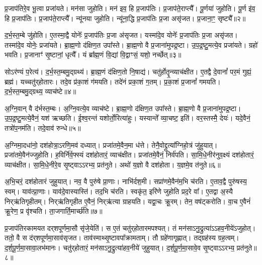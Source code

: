 प्र॒जा\-प॑तिरे॒व भू॒त्वा प्रजा॑यते।
मन॑सा जुहोति।
मन॑ इव॒ हि प्र॒जा\-प॑तिः।
प्र॒जा\-प॑ते॒राप्त्यै᳚।
पू॒र्णया॑ जुहोति।
पू॒र्ण इ॑व॒ हि प्र॒जा\-प॑तिः।
प्र॒जा\-प॑ते॒राप्त्यै᳚।
न्यू॑नया जुहोति।
न्यू॑ना॒द्धि प्र॒जा\-प॑तिः प्र॒जा असृ॑जत।
प्र॒जाना॒ꣳ॒ सृष्ट्यै᳚॥२॥\ip

द॒र्भ॒स्त॒म्बे जु॑होति।
ए॒तस्मा॒द्वै योनेः᳚ प्र॒जा\-प॑तिः प्र॒जा अ॑\-सृजत।
यस्मा॑दे॒व योनेः᳚ प्र॒जा\-प॑तिः प्र॒जा असृ॑जत।
तस्मा॑दे॒व योनेः॒ प्रजा॑यते।
ब्रा॒ह्म॒णो द॑क्षिण॒त उपा᳚स्ते।
ब्रा॒ह्म॒णो वै प्र॒जाना॑मुपद्र॒ष्टा।
उ॒प॒द्र॒ष्टु॒मत्ये॒व प्रजा॑यते।
ग्रहो॑ भवति।
प्र॒जानाꣳ॑ सृ॒ष्टानां॒ धृत्यै᳚।
यं ब्रा᳚ह्म॒णं वि॒द्यां वि॒द्वाꣳसं॒ यशो॒ नर्च्छेत्॥३॥\ip

सोऽर॑ण्यं प॒रेत्य॑।
द॒र्भ॒स्त॒म्बमु॒द्ग्रथ्य॑।
ब्रा॒ह्म॒णं द॑क्षिण॒तो नि॒षाद्य॑।
चतु॑र्\mbox{}होतॄ॒न्व्याच॑क्षीत।
ए॒तद्वै दे॒वानां᳚ पर॒मं गुह्यं॒ ब्रह्म॑।
यच्चतु॑र्‌\mbox{}होतारः।
तदे॒व प्र॑का॒शं ग॑मयति।
तदे॑नं प्रका॒शं ग॒तम्।
प्र॒का॒शं प्र॒जानां᳚ गमयति।
द॒र्भ॒स्त॒म्बमु॒द्ग्रथ्य॒ व्याच॑ष्टे॥४॥\ip

अ॒ग्नि॒वान् वै द॑र्भस्त॒म्बः।
अ॒ग्नि॒वत्ये॒व व्याच॑ष्टे।
ब्रा॒ह्म॒णो द॑क्षिण॒त उपा᳚स्ते।
ब्रा॒ह्म॒णो वै प्र॒जाना॑मुपद्र॒ष्टा।
उ॒प॒द्र॒ष्टु॒मत्ये॒वैनं॒ यश॑ ऋच्छति।
ई॒श्व॒रन्तं यशोर्तो॒रित्या॑हुः।
यस्यान्ते᳚ व्या॒चष्ट॒ इति॑।
वर॒स्तस्मै॒ देयः॑।
यदे॒वैनं॒ तत्रो॑प॒नम॑ति।
तदे॒वाव॑ रुन्धे॥५॥\ip

अ॒ग्निमा॒दधा॑नो॒ दश॑होत्रा॒\-ऽरणि॒मव॑ दध्यात्।
प्रजा॑तमे॒वैन॒मा ध॑त्ते।
तेनै॒वोद्द्रुत्या᳚ग्निहो॒त्रं जु॑हुयात्।
प्रजा॑तमे॒वैन॑ज्जुहोति।
ह॒विर्नि॑र्व॒फ्स्यं दश॑होतारं॒ व्याच॑क्षीत।
प्रजा॑तमे॒वैनं॒ निर्व॑पति।
सा॒मि॒धे॒नीर॑नुव॒क्ष्यं दश॑होतारं॒ व्याच॑क्षीत।
सा॒मि॒धे॒नीरे॒व सृ॒ष्ट्वा\-ऽऽरभ्य॒ प्रत॑नुते।
अथो॑ य॒ज्ञो वै दश॑होता।
य॒ज्ञमे॒व त॑नुते॥६॥\ip

अ॒भि॒चरं॒ दश॑होतारं जुहुयात्।
नव॒ वै पुरु॑षे प्रा॒णाः।
नाभि॑र्दश॒मी।
सप्रा॑णमे॒वैन॑म॒भि च॑रति।
ए॒ताव॒द्वै पुरु॑षस्य॒ स्वम्।
याव॑त्प्रा॒णाः।
याव॑दे॒वास्यास्ति॑।
तद॒भि च॑रति।
स्वकृ॑त॒ इरि॑णे जुहोति प्रद॒रे वा᳚।
ए॒तद्वा अ॒स्यै निर्‌\mbox{}ऋ॑तिगृहीतम्।
निर्‌\mbox{}ऋ॑तिगृहीत ए॒वैनं॒ निर्‌\mbox{}ऋ॑त्या ग्राहयति।
यद्वा॒चः क्रू॒रम्।
तेन॒ वष॑ट्करोति।
वा॒च ए॒वैनं॑ क्रू॒रेण॒ प्र वृ॑श्चति।
ता॒जगार्ति॒मार्च्छ॑ति॥७॥\ip\anuvakamend[दश॑होता॒ सृष्ट्या॑ ऋ॒च्छेद्व्याच॑प्टे रुन्ध ए॒व त॑नुते॒ निर्‌\mbox{}ऋ॑तिगृहीतं॒ पञ्च॑ च]

प्र॒जा\-प॑तिरकामयत दर्‌\mbox{}शपूर्णमा॒सौ सृ॑जे॒येति॑।
स ए॒तं  चतु॑र्‌\mbox{}होतारमपश्यत्।
तं मन॑सा\-ऽनु॒द्रुत्या॑\-ऽऽहव॒नीये॑\-ऽजुहोत्।
ततो॒ वै स द॑र्‌\mbox{}शपूर्णमा॒साव॑\-सृजत।
ताव॑स्माथ्सृ॒ष्टावपा᳚\-क्रामताम्।
तौ ग्रहे॑णागृह्णात्।
तद्ग्रह॑स्य ग्रह॒त्वम्।
द॒र्श॒पू॒र्ण॒मा॒सावा॒लभ॑मानः।
चतु॑र्‌\mbox{}होतारं॒ मन॑सा\-ऽनु॒द्रुत्या॑\-हव॒नीये॑ जुहुयात्।
द॒र्श॒पू॒र्ण॒मा॒सावे॒व सृ॒ष्ट्वा\-ऽऽरभ्य॒ प्रत॑नुते॥८॥\ip

